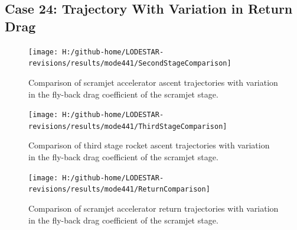 \subsection{Case 24: Trajectory With Variation in Return Drag}
\begin{figure}[!th]
	\centering
	\texttt{[image: H:/github-home/LODESTAR-revisions/results/mode441/SecondStageComparison]}
	\caption{Comparison of scramjet accelerator ascent trajectories with variation in the fly-back drag coefficient of the scramjet stage.}
	\label{fig:SecondStageComparison16}
\end{figure}
\begin{figure}[!th]
	\centering
	\texttt{[image: H:/github-home/LODESTAR-revisions/results/mode441/ThirdStageComparison]}
	\caption{Comparison of third stage rocket ascent trajectories with variation in the fly-back drag coefficient of the scramjet stage.}
	\label{fig:ThirdStageComparison16}
\end{figure}
\begin{figure}[!th]
	\centering
	\texttt{[image: H:/github-home/LODESTAR-revisions/results/mode441/ReturnComparison]}
	\caption{Comparison of scramjet accelerator return trajectories with variation in the fly-back drag coefficient of the scramjet stage.}
	\label{fig:ReturnComparison16}
\end{figure}
\FloatBarrier
\clearpage

